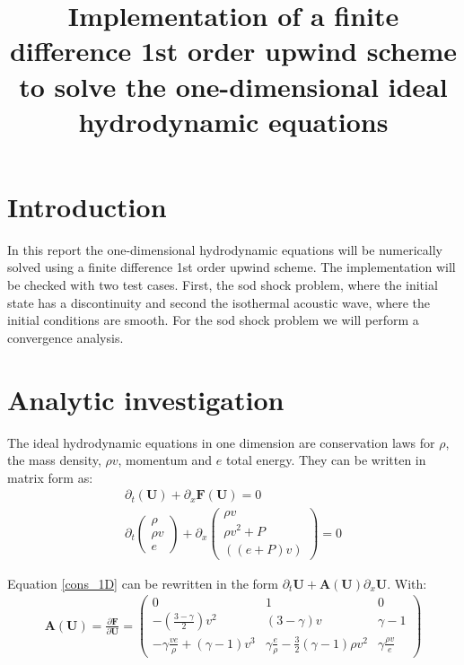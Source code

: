 \documentclass[12pt,a4paper]{article}
\title{Implementation of a finite difference 1st order upwind scheme to solve the one-dimensional ideal hydrodynamic equations}
\begin{document}
\maketitle

\section{Introduction}
In this report the one-dimensional hydrodynamic equations will be numerically solved using a finite difference 1st order upwind scheme. The implementation will be checked with two test cases. First, the sod shock problem, where the initial state has a discontinuity and second the isothermal acoustic wave, where the initial conditions are smooth. For the sod shock problem we will perform a convergence analysis. 

\section{Analytic investigation}
The ideal hydrodynamic equations in one dimension are conservation laws for $\rho$, the mass density, $\rho v$, momentum and $e$ total energy. They can be written in matrix form as:
\begin{align}
\partial_{t}\left(\textbf{U}\right) + \partial_{x}\textbf{F}\left(\textbf{U}\right) = 0 \\
\partial_{t}\begin{pmatrix} \rho \\
\rho v \\
e
\end{pmatrix}
+
\partial_{x}\begin{pmatrix} \rho v \\
\rho v^{2} + P \\
\left((e + P) v\right)
\end{pmatrix} = 0 \label{cons_1D}
\end{align}

Equation \eqref{cons_1D} can be rewritten in the form $\partial_t \textbf{U} + \textbf{A}\left(\textbf{U}\right)\partial_x \textbf{U}$. With: 
\begin{align}
\textbf{A}\left(\textbf{U}\right) = \frac{\partial \textbf{F}}{\partial \textbf{U}} = 
\begin{pmatrix}
0 & 1 & 0 \\
- \left(\frac{3-\gamma}{2}\right)v^{2} & \left(3 - \gamma\right)v & \gamma - 1 \\
- \gamma \frac{v e}{\rho} + \left(\gamma - 1\right)v^{3} & \gamma \frac{ e}{\rho} - \frac{3}{2}\left(\gamma -1 \right)\rho v^{2} & \gamma\frac{\rho v}{e}
\end{pmatrix} \label{A}
\end{align}
\end{document}
